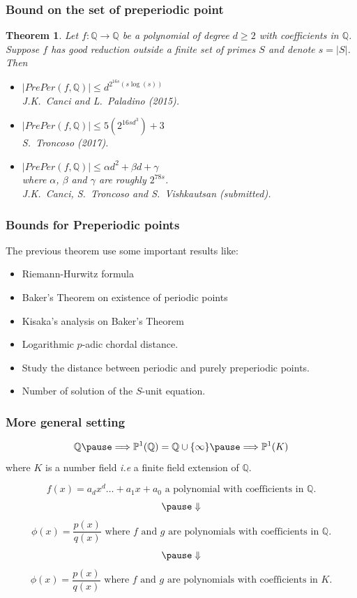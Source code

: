 \documentclass{beamer}
\def\jump{ \quad \\ \vspace{0.7cm} \pause}
\def\PP{{\mathbb P}}
\def\QQ{{\mathbb Q}}
\theoremstyle{thmstyle}
\theoremstyle{thmstyle}
\newtheorem*{mythm}{Theorem}
\theoremstyle{thmstyle}
\theoremstyle{mystyle}
\theoremstyle{qstnstyle}
\begin{document}
\begin{frame}
\frametitle{Bound on the set of preperiodic point} 
\begin{mythm}


Let $f : \QQ\to\QQ$ be a polynomial of degree $d\geq{2}$ with coefficients in $\QQ$. 
Suppose $f$ has good reduction outside a finite set of primes $S$ and denote $s=|S|$. Then \pause
\begin{itemize}

\item $|PrePer(f,\QQ)|\leq  d^{2^{16s}\left(s\log(s)\right)}$
 \\ J.K.\ Canci and L.\ Paladino (2015).\jump
\item $|PrePer(f,\QQ)|\leq 5\left(2^{16sd^3}\right)+3$
 \\ S.\ Troncoso (2017).\jump
\item $|PrePer(f,\QQ)|\leq \alpha d^2+\beta d+\gamma$ \\  where $\alpha$, $\beta$ and $\gamma$ are roughly $2^{78s}$.
\\ J.K.\ Canci, S.\ Troncoso and S.\ Vishkautsan (submitted).

\end{itemize}
\end{mythm}
\end{frame}


\begin{frame}
\frametitle{Bounds for Preperiodic points}

The previous theorem use some important results like:\pause
\jump
\begin{itemize}
\item Riemann-Hurwitz formula
\pause
\item  Baker's Theorem on existence of periodic points
\pause
\item Kisaka's analysis on Baker's Theorem
\pause
\item Logarithmic $p$-adic chordal distance.
\pause
\item Study the distance between periodic and purely preperiodic points.
\pause
\item Number of solution of the $S$-unit equation.
\end{itemize}
\end{frame}

\begin{frame}
\frametitle{More general setting}
$$\QQ\pause\Longrightarrow \PP^1(\QQ)=\QQ \cup \{\infty\}\pause\Longrightarrow \PP^1(K) $$
where $K$ is a number field \textit{i.e} a finite field extension of $\QQ$.
\pause \vspace{3mm}

\begin{center}
$$f(x)=a_dx^d\ldots+a_1x+a_0 \mbox{ a polynomial with coefficients in } \QQ.$$
$$\pause\Downarrow$$
$$\phi(x)=\frac{p(x)}{q(x)} \mbox{ where $f$ and $g$ are polynomials with coefficients in } \QQ.$$
$$\pause\Downarrow$$
$$\phi(x)=\frac{p(x)}{q(x)} \mbox{ where $f$ and $g$ are polynomials with coefficients in } K.$$
\end{center}
\end{frame}
\end{document}
